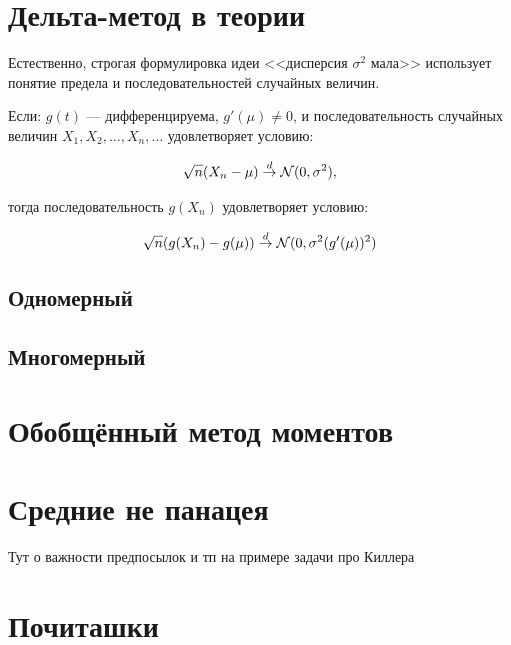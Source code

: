 \documentclass[12pt, a4paper, oneside]{article}
\begin{document}
\section*{Дельта-метод в теории}

Естественно, строгая формулировка идеи <<дисперсия $\sigma^2$ мала>> использует понятие предела и последовательностей случайных величин.

Если:  $g(t)$ --- дифференцируема, $g'(\mu)\neq 0$, и последовательность случайных величин $X_1, X_2, \ldots, X_n, \ldots $ удовлетворяет условию:

\[
\sqrt{n} (X_n - \mu) \overset{d}{\to}  \mathcal{N}(0,\sigma^2),
\]

тогда последовательность $g(X_n)$ удовлетворяет условию:

\[
\sqrt{n} (g(X_n) - g(\mu)) \overset{d}{\to} \mathcal{N}(0,\sigma^2 (g'(\mu))^2 )
\]


\subsection{Одномерный} 

\subsection{Многомерный} 

\section{Обобщённый метод моментов} 

\section{Средние не панацея}

Тут о важности предпосылок и тп на примере задачи про Киллера


\section*{Почиташки} 

\end{document}
